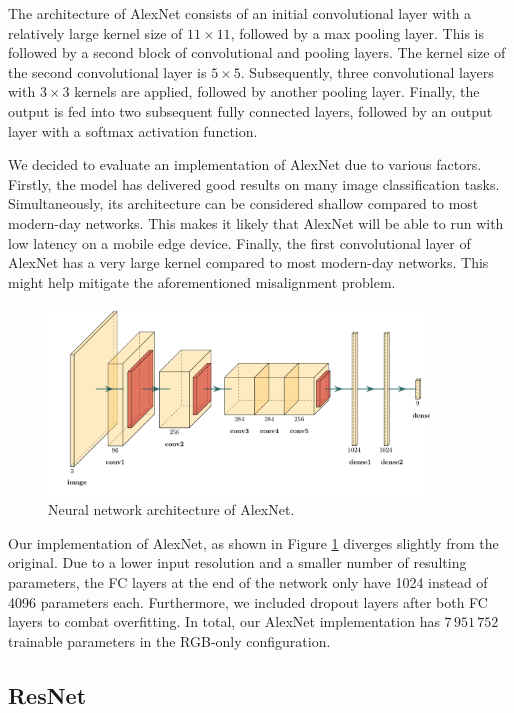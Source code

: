 \documentclass{l4proj}
\begin{document}
The architecture of AlexNet consists of an initial convolutional layer with a relatively large kernel size of $11 \times 11$, followed by a max pooling layer. This is followed by a second block of convolutional and pooling layers. The kernel size of the second convolutional layer is $5 \times 5$. Subsequently, three convolutional layers with $3 \times 3$ kernels are applied, followed by another pooling layer. Finally, the output is fed into two subsequent fully connected layers, followed by an output layer with a softmax activation function.

We decided to evaluate an implementation of AlexNet due to various factors. Firstly, the model has delivered good results on many image classification tasks. Simultaneously, its architecture can be considered shallow compared to most modern-day networks. This makes it likely that AlexNet will be able to run with low latency on a mobile edge device. Finally, the first convolutional layer of AlexNet has a very large kernel compared to most modern-day networks. This might help mitigate the aforementioned misalignment problem.

\begin{figure}[ht]
  \centering
  \includegraphics[width=0.9\textwidth]{images/models/alexnet}
  \caption{Neural network architecture of AlexNet.}
  \label{fig:alexnet}
\end{figure}

Our implementation of AlexNet, as shown in Figure \ref{fig:alexnet} diverges slightly from the original. Due to a lower input resolution and a smaller number of resulting parameters, the FC layers at the end of the network only have 1024 instead of 4096 parameters each. Furthermore, we included dropout layers after both FC layers to combat overfitting. In total, our AlexNet implementation has $7\,951\,752$ trainable parameters in the RGB-only configuration.

\subsection{ResNet}
\end{document}
